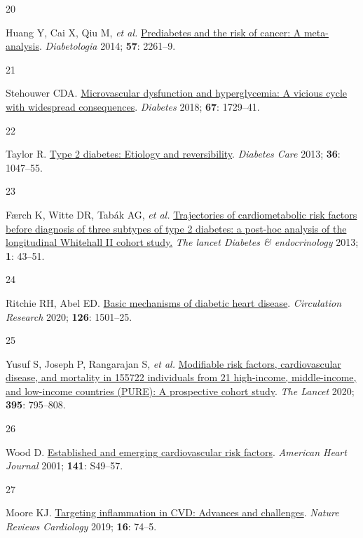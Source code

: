 \documentclass[
  a4paper,
  headsepline=true,
  open=any]{scrbook}
\newlength{\cslhangindent}
\newlength{\csllabelwidth}
\newlength{\cslentryspacingunit} %
\newenvironment{CSLReferences}[2] %
 {%
  \setlength{\parindent}{0pt}
  \ifodd #1
  \let\oldpar\par
  \def\par{\hangindent=\cslhangindent\oldpar}
  \fi
  \setlength{\parskip}{#2\cslentryspacingunit}
 }%
 {}
\newcommand{\CSLLeftMargin}[1]{\parbox[t]{\csllabelwidth}{#1}}
\newcommand{\CSLRightInline}[1]{\parbox[t]{\linewidth - \csllabelwidth}{#1}\break}
\begin{document}
\begin{CSLReferences}{0}{0}
\leavevmode{}%
\CSLLeftMargin{20 }%
\CSLRightInline{Huang Y, Cai X, Qiu M, \emph{et al.}
\href{https://doi.org/10.1007/s00125-014-3361-2}{Prediabetes and the
risk of cancer: A meta-analysis}. \emph{Diabetologia} 2014; \textbf{57}:
2261--9.}

\leavevmode{}%
\CSLLeftMargin{21 }%
\CSLRightInline{Stehouwer CDA.
\href{https://doi.org/10.2337/dbi17-0044}{Microvascular dysfunction and
hyperglycemia: A vicious cycle with widespread consequences}.
\emph{Diabetes} 2018; \textbf{67}: 1729--41.}

\leavevmode{}%
\CSLLeftMargin{22 }%
\CSLRightInline{Taylor R. \href{https://doi.org/10.2337/dc12-1805}{Type
2 diabetes: Etiology and reversibility}. \emph{Diabetes Care} 2013;
\textbf{36}: 1047--55.}

\leavevmode{}%
\CSLLeftMargin{23 }%
\CSLRightInline{Færch K, Witte DR, Tabák AG, \emph{et al.}
\href{https://doi.org/10.1016/S2213-8587(13)70008-1}{Trajectories of
cardiometabolic risk factors before diagnosis of three subtypes of type
2 diabetes: a post-hoc analysis of the longitudinal Whitehall II cohort
study.} \emph{The lancet Diabetes \& endocrinology} 2013; \textbf{1}:
43--51.}

\leavevmode{}%
\CSLLeftMargin{24 }%
\CSLRightInline{Ritchie RH, Abel ED.
\href{https://doi.org/10.1161/CIRCRESAHA.120.315913}{Basic mechanisms of
diabetic heart disease}. \emph{Circulation Research} 2020; \textbf{126}:
1501--25.}

\leavevmode{}%
\CSLLeftMargin{25 }%
\CSLRightInline{Yusuf S, Joseph P, Rangarajan S, \emph{et al.}
\href{https://doi.org/10.1016/S0140-6736(19)32008-2}{Modifiable risk
factors, cardiovascular disease, and mortality in 155{\hphantom{,}}722
individuals from 21 high-income, middle-income, and low-income countries
(PURE): A prospective cohort study}. \emph{The Lancet} 2020;
\textbf{395}: 795--808.}

\leavevmode{}%
\CSLLeftMargin{26 }%
\CSLRightInline{Wood D.
\href{https://doi.org/10.1067/mhj.2001.109951}{Established and emerging
cardiovascular risk factors}. \emph{American Heart Journal} 2001;
\textbf{141}: S49--57.}

\leavevmode{}%
\CSLLeftMargin{27 }%
\CSLRightInline{Moore KJ.
\href{https://doi.org/10.1038/s41569-018-0144-3}{Targeting inflammation
in CVD: Advances and challenges}. \emph{Nature Reviews Cardiology} 2019;
\textbf{16}: 74--5.}


\end{CSLReferences}
\end{document}
